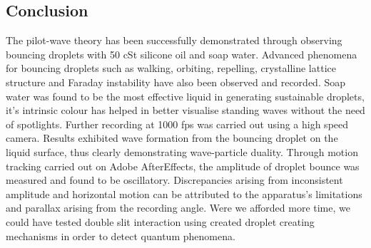 \subsection{Conclusion}
The pilot-wave theory has been successfully demonstrated through observing bouncing droplets with 50 cSt silicone oil and soap water. Advanced phenomena for bouncing droplets such as walking, orbiting, repelling, crystalline lattice structure and Faraday instability have also been observed and recorded. Soap water was found to be the most effective liquid in generating sustainable droplets, it’s intrinsic colour has helped in better visualise standing waves without the need of spotlights. Further recording at 1000 fps was carried out using a high speed camera. Results exhibited wave formation from the bouncing droplet on the liquid surface, thus clearly demonstrating wave-particle duality. Through motion tracking carried out on Adobe AfterEffects, the amplitude of droplet bounce was measured and found to be oscillatory. Discrepancies arising from inconsistent amplitude and horizontal motion can be attributed to the apparatus’s limitations and parallax arising from the recording angle. Were we afforded more time, we could have tested double slit interaction using created droplet creating mechanisms in order to detect quantum phenomena.
